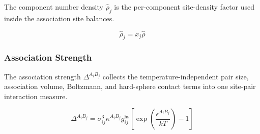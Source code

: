 \documentclass[12pt, letterpaper]{article}
\begin{document}
The component number density \(\hat\rho_j\) is the per-component site-density factor used inside the association site balances.

\begin{equation}
    \hat{\rho}_{j}=x_{j}\hat{\rho}
    \label{eq:rho_j_assoc}
\end{equation}

\subsubsection{Association Strength}

The association strength \(\Delta^{A_iB_j}\) collects the temperature-independent pair size, association volume, Boltzmann, and hard-sphere contact terms into one site-pair interaction measure.

\begin{equation}
    \Delta^{A_iB_j}=\sigma_{ij}^{3}\kappa^{A_iB_j}g_{ij}^{\mathrm{hs}}
    \left[\exp\!\left(\frac{\epsilon^{A_iB_j}}{kT}\right)-1\right]
    \label{eq:delta_assoc}
\end{equation}

\end{document}
